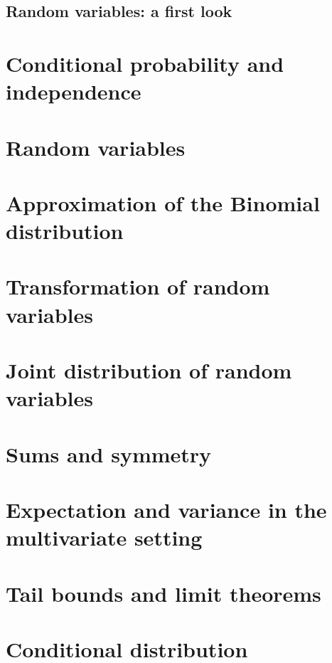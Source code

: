   
  \subsection{Random variables: a first look}
  \label{subsec:1.5}



\section{Conditional probability and independence}
\label{sec:cond-prob-indep}


\section{Random variables}
\label{sec:random-variables}


\section{Approximation of the Binomial distribution}
\label{sec:appr-binom-distr}


\section{Transformation of random variables}
\label{sec:transf-rand-vari}


\section{Joint distribution of random variables}
\label{sec:joint-distr-rand}


\section{Sums and symmetry}
\label{sec:sums-symmetry}


\section{Expectation and variance in the multivariate setting}
\label{sec:expect-vari-mult}


\section{Tail bounds and limit theorems}
\label{sec:tail-bounds-limit}


\section{Conditional distribution}
\label{sec:cond-distr}





